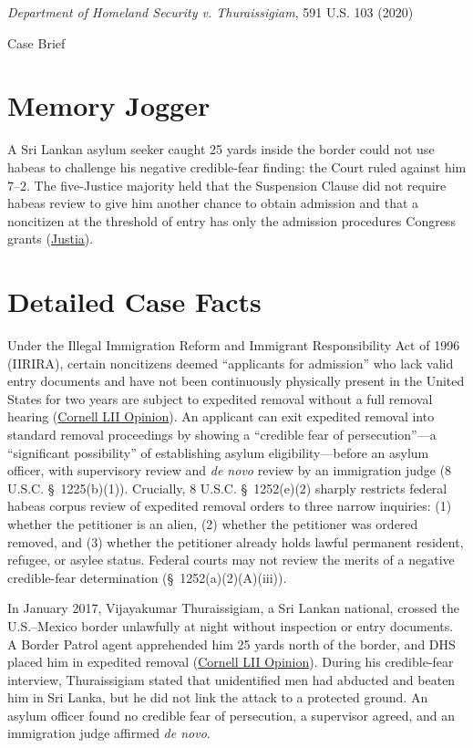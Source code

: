\documentclass[12pt]{article}
\begin{document}
\begin{center}
{\LARGE \textit{Department of Homeland Security v. Thuraissigiam}, 591 U.S. 103 (2020)\par}
\vspace{0.8em}
{\large Case Brief\par}
\end{center}
\vspace{1em}

\section{Memory Jogger}
A Sri Lankan asylum seeker caught 25 yards inside the border could not use habeas to challenge his negative credible-fear finding: the Court ruled against him 7--2. The five-Justice majority held that the Suspension Clause did not require habeas review to give him another chance to obtain admission and that a noncitizen at the threshold of entry has only the admission procedures Congress grants (\href{https://supreme.justia.com/cases/federal/us/591/19-161/}{Justia}).

\section{Detailed Case Facts}
Under the Illegal Immigration Reform and Immigrant Responsibility Act of 1996 (IIRIRA), certain noncitizens deemed ``applicants for admission'' who lack valid entry documents and have not been continuously physically present in the United States for two years are subject to expedited removal without a full removal hearing (\href{https://www.law.cornell.edu/supremecourt/text/19-161}{Cornell LII Opinion}). An applicant can exit expedited removal into standard removal proceedings by showing a ``credible fear of persecution''---a ``significant possibility'' of establishing asylum eligibility---before an asylum officer, with supervisory review and \textit{de novo} review by an immigration judge (8 U.S.C. \S\ 1225(b)(1)). Crucially, 8 U.S.C. \S\ 1252(e)(2) sharply restricts federal habeas corpus review of expedited removal orders to three narrow inquiries: (1) whether the petitioner is an alien, (2) whether the petitioner was ordered removed, and (3) whether the petitioner already holds lawful permanent resident, refugee, or asylee status. Federal courts may not review the merits of a negative credible-fear determination (\S\ 1252(a)(2)(A)(iii)).

In January 2017, Vijayakumar Thuraissigiam, a Sri Lankan national, crossed the U.S.--Mexico border unlawfully at night without inspection or entry documents. A Border Patrol agent apprehended him 25 yards north of the border, and DHS placed him in expedited removal (\href{https://www.law.cornell.edu/supremecourt/text/19-161}{Cornell LII Opinion}). During his credible-fear interview, Thuraissigiam stated that unidentified men had abducted and beaten him in Sri Lanka, but he did not link the attack to a protected ground. An asylum officer found no credible fear of persecution, a supervisor agreed, and an immigration judge affirmed \textit{de novo}.
\end{document}
